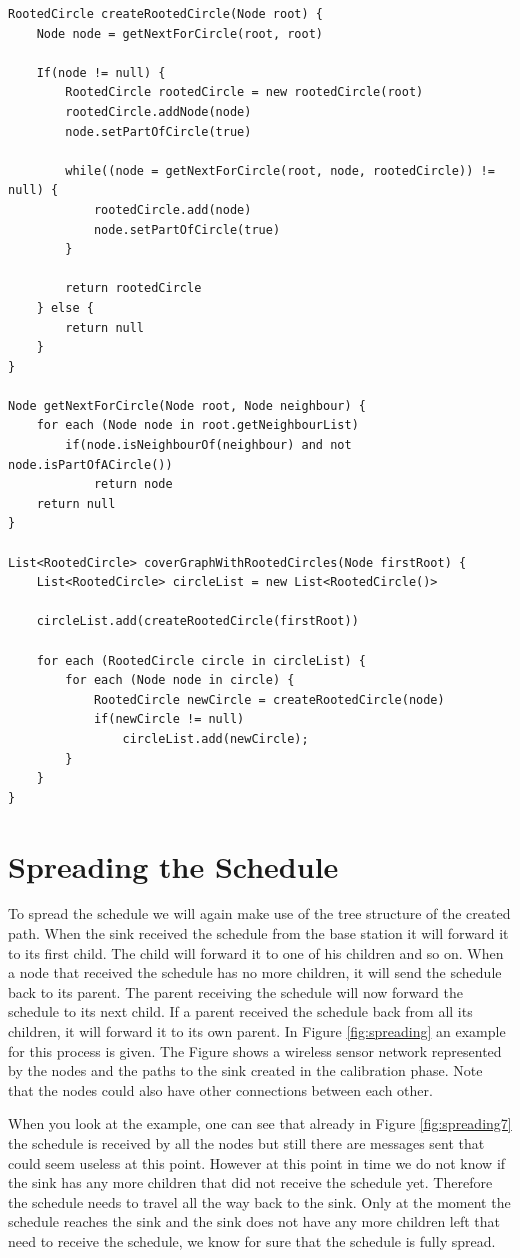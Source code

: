 \begin{lstlisting}
RootedCircle createRootedCircle(Node root) {
	Node node = getNextForCircle(root, root)	

	If(node != null) {
		RootedCircle rootedCircle = new rootedCircle(root)
		rootedCircle.addNode(node)
		node.setPartOfCircle(true)

		while((node = getNextForCircle(root, node, rootedCircle)) != null) {
			rootedCircle.add(node)
			node.setPartOfCircle(true)
		}

		return rootedCircle
	} else {
		return null
	}
}

Node getNextForCircle(Node root, Node neighbour) {
	for each (Node node in root.getNeighbourList)	
		if(node.isNeighbourOf(neighbour) and not node.isPartOfACircle())
			return node
	return null
}

List<RootedCircle> coverGraphWithRootedCircles(Node firstRoot) {
	List<RootedCircle> circleList = new List<RootedCircle()>
	
	circleList.add(createRootedCircle(firstRoot))

	for each (RootedCircle circle in circleList) {
		for each (Node node in circle) {
			RootedCircle newCircle = createRootedCircle(node)
			if(newCircle != null)
				circleList.add(newCircle);
		}
	}
}
\end{lstlisting}

\section{Spreading the Schedule}
To spread the schedule we will again make use of the tree structure of the created path. When the sink received the schedule from the base station it will forward it to its first child. The child will forward it to one of his children and so on. When a node that received the schedule has no more children, it will send the schedule back to its parent. The parent receiving the schedule will now forward the schedule to its next child. If a parent received the schedule back from all its children, it will forward it to its own parent. In Figure \ref{fig:spreading} an example for this process is given. The Figure shows a wireless sensor network represented by the nodes and the paths to the sink created in the calibration phase. Note that the nodes could also have other connections between each other. 

When you look at the example, one can see that already in Figure \ref{fig:spreading7} the schedule is received by all the nodes but still there are messages sent that could seem useless at this point. However at this point in time we do not know if the sink has any more children that did not receive the schedule yet. Therefore the schedule needs to travel all the way back to the sink. Only at the moment the schedule reaches the sink and the sink does not have any more children left that need to receive the schedule, we know for sure that the schedule is fully spread.

